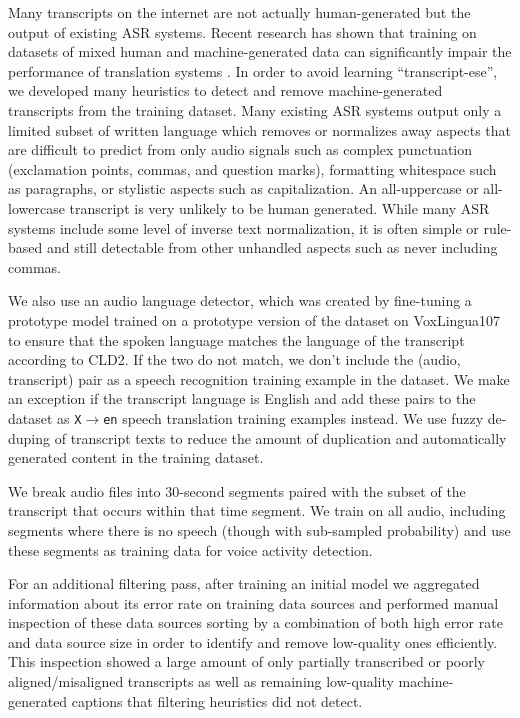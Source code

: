 \documentclass[nohyperref]{article}
\theoremstyle{plain}
\theoremstyle{definition}
\theoremstyle{remark}
\begin{document}
Many transcripts on the internet are not actually human-generated but the output of existing ASR systems. Recent research has shown that training on datasets of mixed human and machine-generated data can significantly impair the performance of translation systems \cite{ghorbani2021scaling}. In order to avoid learning ``transcript-ese'', we developed many heuristics to detect and remove machine-generated transcripts from the training dataset. Many existing ASR systems output only a limited subset of written language which removes or normalizes away aspects that are difficult to predict from only audio signals such as complex punctuation (exclamation points, commas, and question marks), formatting whitespace such as paragraphs, or stylistic aspects such as capitalization. An all-uppercase or all-lowercase transcript is very unlikely to be human generated. While many ASR systems include some level of inverse text normalization, it is often simple or rule-based and still detectable from other unhandled aspects such as never including commas.

We also use an audio language detector, which was created by fine-tuning a prototype model trained on a prototype version of the dataset on VoxLingua107 \cite{valk2021voxlingua107} to ensure that the spoken language matches the language of the transcript according to CLD2. If the two do not match, we don't include the (audio, transcript) pair as a speech recognition training example in the dataset. We make an exception if the transcript language is English and add these pairs to the dataset as \texttt{X$\rightarrow$en} speech translation training examples instead. We use fuzzy de-duping of transcript texts to reduce the amount of duplication and automatically generated content in the training dataset.

We break audio files into 30-second segments paired with the subset of the transcript that occurs within that time segment. We train on all audio, including segments where there is no speech (though with sub-sampled probability) and use these segments as training data for voice activity detection.

For an additional filtering pass, after training an initial model we aggregated information about its error rate on training data sources and performed manual inspection of these data sources sorting by a combination of both high error rate and data source size in order to identify and remove low-quality ones efficiently. This inspection showed a large amount of only partially transcribed or poorly aligned/misaligned transcripts as well as remaining low-quality machine-generated captions that filtering heuristics did not detect.
\end{document}
